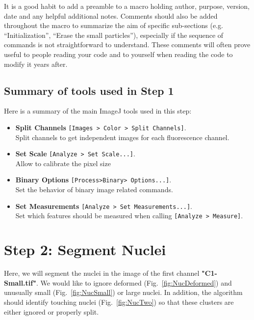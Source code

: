 \documentclass[11pt,a4paper,oneside]{report}
\newcommand{\ijmenu}[1]{\texttt{\small#1}}
\begin{document}
It is a good habit to add a preamble to a macro holding author, purpose, version, date and any helpful additional notes. Comments should also be added throughout the macro to summarize the aim of specific sub-sections (e.g. ``Initialization'', ``Erase the small particles''), especially if the sequence of commands is not straightforward to understand. These comments will often prove useful to people reading your code and to yourself when reading the code to modify it years after.

\subsection{Summary of tools used in Step 1}

Here is a summary of the main ImageJ tools used in this step:

\begin{itemize}
\item \textbf{Split Channels} \ijmenu{[Images > Color > Split Channels]}.\\
Split channels to get independent images for each fluorescence channel.

\item \textbf{Set Scale} \ijmenu{[Analyze > Set Scale...]}.\\
Allow to calibrate the pixel size

\item \textbf{Binary Options} \ijmenu{[Process>Binary> Options...]}.\\ 
Set the behavior of binary image related commands.

\item \textbf{Set Measurements} \ijmenu{[Analyze > Set Measurements...]}.\\ 
Set which features should be measured when calling \ijmenu{[Analyze > Measure]}.
\end{itemize} 



\newpage
\section{Step 2: Segment Nuclei}

Here, we will segment the nuclei in the image of the first channel \textbf{"C1-Small.tif"}. We would like to ignore deformed (Fig.~\ref{fig:NucDeformed}) and unusually small (Fig.~\ref{fig:NucSmall}) or large nuclei. In addition, the algorithm should identify touching nuclei (Fig.~\ref{fig:NucTwo}) so that these clusters are either ignored or properly split.
\end{document}
